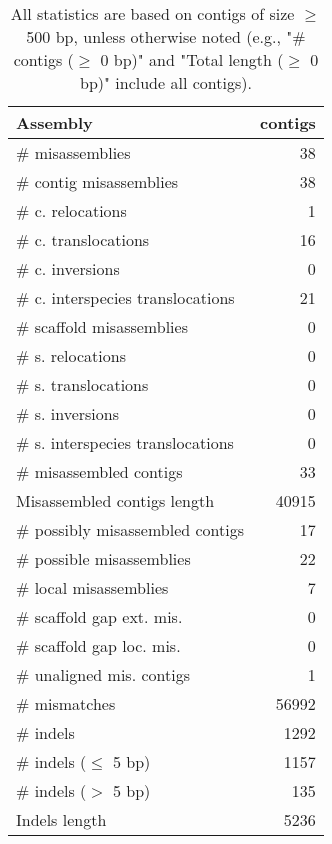 \documentclass[12pt,a4paper]{article}
\begin{document}
\begin{table}[ht]
\begin{center}
\caption{All statistics are based on contigs of size $\geq$ 500 bp, unless otherwise noted (e.g., "\# contigs ($\geq$ 0 bp)" and "Total length ($\geq$ 0 bp)" include all contigs).}
\begin{tabular}{|l*{1}{|r}|}
\hline
Assembly & contigs \\ \hline
\# misassemblies & 38 \\ \hline
\hspace{2mm}\# contig misassemblies & 38 \\ \hline
\hspace{5mm}\# c. relocations & 1 \\ \hline
\hspace{5mm}\# c. translocations & 16 \\ \hline
\hspace{5mm}\# c. inversions & 0 \\ \hline
\hspace{5mm}\# c. interspecies translocations & 21 \\ \hline
\hspace{2mm}\# scaffold misassemblies & 0 \\ \hline
\hspace{5mm}\# s. relocations & 0 \\ \hline
\hspace{5mm}\# s. translocations & 0 \\ \hline
\hspace{5mm}\# s. inversions & 0 \\ \hline
\hspace{5mm}\# s. interspecies translocations & 0 \\ \hline
\# misassembled contigs & 33 \\ \hline
Misassembled contigs length & 40915 \\ \hline
\# possibly misassembled contigs & 17 \\ \hline
\hspace{5mm}\# possible misassemblies & 22 \\ \hline
\# local misassemblies & 7 \\ \hline
\# scaffold gap ext. mis. & 0 \\ \hline
\# scaffold gap loc. mis. & 0 \\ \hline
\# unaligned mis. contigs & 1 \\ \hline
\# mismatches & 56992 \\ \hline
\# indels & 1292 \\ \hline
\hspace{5mm}\# indels ($\leq$ 5 bp) & 1157 \\ \hline
\hspace{5mm}\# indels ($>$ 5 bp) & 135 \\ \hline
Indels length & 5236 \\ \hline
\end{tabular}
\end{center}
\end{table}
\end{document}
